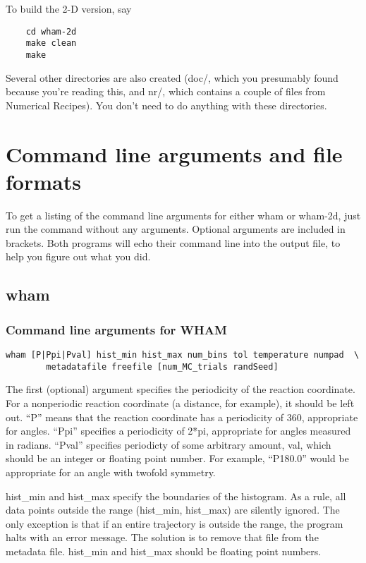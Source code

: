 \documentclass[12pt]{article}
\begin{document}
To build the 2-D version,  say

\begin{verbatim}
    cd wham-2d
    make clean
    make
\end{verbatim}

Several other directories are also created (doc/, which you presumably found
because you're reading this, and nr/, which contains a couple of files from
Numerical Recipes).  You don't need to do anything with these directories.

\section{Command line arguments and file formats}

To get a listing of the command line arguments for either wham or wham-2d,
just run the command without any arguments.  Optional arguments are
included in brackets.  Both programs will echo their command line into the
output file, to help you figure out what you did.

\subsection{wham}

\subsubsection{Command line arguments for WHAM}

\begin{verbatim}
wham [P|Ppi|Pval] hist_min hist_max num_bins tol temperature numpad  \
        metadatafile freefile [num_MC_trials randSeed]
\end{verbatim}

The first (optional) argument specifies the periodicity of the reaction
coordinate.  For a nonperiodic reaction coordinate (a distance, for
example), it should be left out.  ``P'' means that the reaction coordinate
has a periodicity of 360, appropriate for angles. ``Ppi'' specifies a
periodicity of 2*pi, appropriate for angles measured in radians.  ``Pval''
specifies periodicty of some arbitrary amount, val, which should be an
integer or floating point number.  For example, ``P180.0'' would be
appropriate for an angle with twofold symmetry.

hist\_min and hist\_max specify the boundaries of the histogram.  As a rule,
all data points outside the range (hist\_min, hist\_max) are silently
ignored.  The only exception is that if an entire trajectory is outside the
range, the program halts with an error message.  The solution is to remove
that file from the metadata file.  hist\_min and hist\_max should be floating
point numbers.
\end{document}
